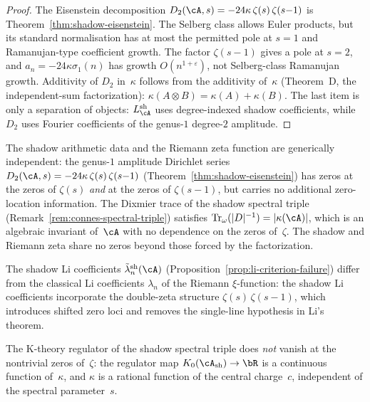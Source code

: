 \begin{proof}
The Eisenstein decomposition
$D_2(\cA,s) = -24\kappa\,\zeta(s)\,\zeta(s{-}1)$
is Theorem~\ref{thm:shadow-eisenstein}. The Selberg class
allows Euler products, but its standard normalisation has at most the
permitted pole at $s=1$ and Ramanujan-type coefficient growth. The
factor $\zeta(s-1)$ gives a pole at $s=2$, and
$a_n=-24\kappa\sigma_1(n)$ has growth $O(n^{1+\varepsilon})$, not
Selberg-class Ramanujan growth.
Additivity of $D_2$ in~$\kappa$ follows from the additivity
of~$\kappa$ (Theorem~D, the independent-sum factorization):
$\kappa(A \otimes B) = \kappa(A) + \kappa(B)$. The
last item is only a separation of objects: $L_\cA^{\mathrm{sh}}$
uses degree-indexed shadow coefficients, while $D_2$ uses Fourier
coefficients of the genus-$1$ degree-$2$ amplitude.
\end{proof}

\begin{remark}
\label{rem:shadow-riemann-independence}
The shadow arithmetic data and the Riemann zeta function are
generically independent: the genus-$1$ amplitude Dirichlet
series $D_2(\cA,s) = -24\kappa\,\zeta(s)\,\zeta(s{-}1)$
(Theorem~\ref{thm:shadow-eisenstein})
has zeros at the zeros of $\zeta(s)$ \emph{and} at the
zeros of $\zeta(s{-}1)$, but carries no additional
zero-location information. The Dixmier trace of the shadow
spectral triple
(Remark~\ref{rem:connes-spectral-triple}) satisfies
$\operatorname{Tr}_\omega(|D|^{-1}) = |\kappa(\cA)|$, which
is an algebraic invariant of~$\cA$ with no dependence on the
zeros of~$\zeta$. The shadow and Riemann zeta share no zeros
beyond those forced by the factorization.

The shadow Li coefficients
$\tilde\lambda_n^{\mathrm{sh}}(\cA)$
(Proposition~\ref{prop:li-criterion-failure}) differ from the
classical Li coefficients $\lambda_n$ of the Riemann
$\xi$-function: the shadow Li coefficients incorporate the
double-zeta structure $\zeta(s)\,\zeta(s{-}1)$, which
introduces shifted zero loci and removes the single-line hypothesis
in Li's theorem.

The K-theory regulator of the shadow spectral triple
does \emph{not} vanish at the nontrivial zeros of~$\zeta$:
the regulator map $K_0(\cA_{\mathrm{sh}}) \to \bR$ is a
continuous function of~$\kappa$, and $\kappa$ is a rational
function of the central charge~$c$, independent of the
spectral parameter~$s$.
\end{remark}


